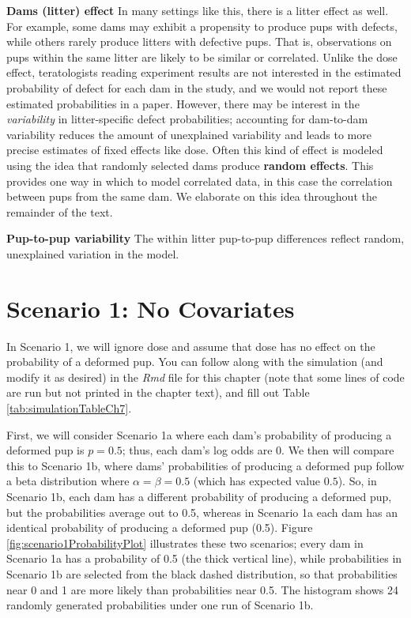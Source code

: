 \documentclass[
]{krantz}
\begin{document}
\textbf{Dams (litter) effect} In many settings like this, there is a litter effect as well. For example, some dams may exhibit a propensity to produce pups with defects, while others rarely produce litters with defective pups. That is, observations on pups within the same litter are likely to be similar or correlated. Unlike the dose effect, teratologists reading experiment results are not interested in the estimated probability of defect for each dam in the study, and we would not report these estimated probabilities in a paper. However, there may be interest in the \emph{variability} in litter-specific defect probabilities; accounting for dam-to-dam variability reduces the amount of unexplained variability and leads to more precise estimates of fixed effects like dose. Often this kind of effect is modeled using the idea that randomly selected dams produce \textbf{random effects}.  This provides one way in which to model correlated data, in this case the correlation between pups from the same dam. We elaborate on this idea throughout the remainder of the text.

\textbf{Pup-to-pup variability} The within litter pup-to-pup differences reflect random, unexplained variation in the model.

\hypertarget{scenario-1-no-covariates}{%
\section{Scenario 1: No Covariates}\label{scenario-1-no-covariates}}

In Scenario 1, we will ignore dose and assume that dose has no effect on the probability of a deformed pup. You can follow along with the simulation (and modify it as desired) in the \emph{Rmd} file for this chapter (note that some lines of code are run but not printed in the chapter text), and fill out Table \ref{tab:simulationTableCh7}.

First, we will consider Scenario 1a where each dam's probability of producing a deformed pup is \(p = 0.5\); thus, each dam's log odds are 0. We then will compare this to Scenario 1b, where dams' probabilities of producing a deformed pup follow a beta distribution where \(\alpha = \beta = 0.5\) (which has expected value \(0.5\)). So, in Scenario 1b, each dam has a different probability of producing a deformed pup, but the probabilities average out to 0.5, whereas in Scenario 1a each dam has an identical probability of producing a deformed pup (0.5). Figure \ref{fig:scenario1ProbabilityPlot} illustrates these two scenarios; every dam in Scenario 1a has a probability of 0.5 (the thick vertical line), while probabilities in Scenario 1b are selected from the black dashed distribution, so that probabilities near 0 and 1 are more likely than probabilities near 0.5. The histogram shows 24 randomly generated probabilities under one run of Scenario 1b.
\end{document}
